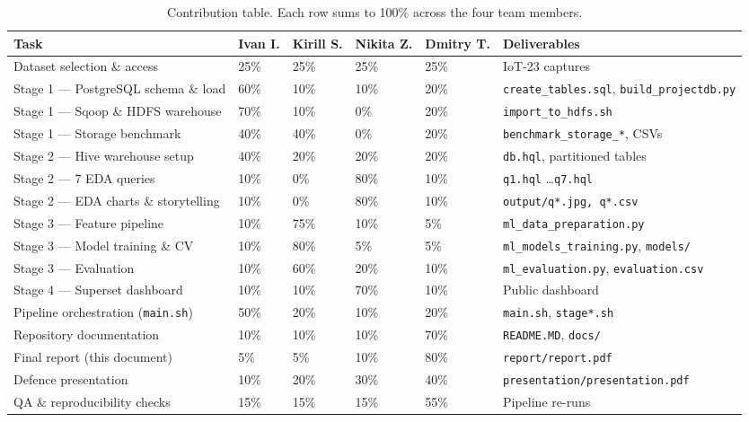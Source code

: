 \documentclass[11pt,a4paper]{article}
\begin{document}
\begin{table}[H]
\centering
\small
\renewcommand{\arraystretch}{1.2}
\begin{tabular}{p{4.5cm}p{1.6cm}p{1.6cm}p{1.6cm}p{1.6cm}p{2.6cm}}
\toprule
\textbf{Task} & \textbf{Ivan I.} & \textbf{Kirill S.} & \textbf{Nikita Z.} & \textbf{Dmitry T.} & \textbf{Deliverables} \\
\midrule
Dataset selection \& access            & 25\% & 25\% & 25\% & 25\% & IoT-23 captures \\
Stage 1 --- PostgreSQL schema \& load  & 60\% & 10\% & 10\% & 20\% & \texttt{create\_tables.sql}, \texttt{build\_projectdb.py} \\
Stage 1 --- Sqoop \& HDFS warehouse    & 70\% & 10\% &  0\% & 20\% & \texttt{import\_to\_hdfs.sh} \\
Stage 1 --- Storage benchmark          & 40\% & 40\% &  0\% & 20\% & \texttt{benchmark\_storage\_*}, CSVs \\
Stage 2 --- Hive warehouse setup       & 40\% & 20\% & 20\% & 20\% & \texttt{db.hql}, partitioned tables \\
Stage 2 --- 7 EDA queries              & 10\% &  0\% & 80\% & 10\% & \texttt{q1.hql} \dots \texttt{q7.hql} \\
Stage 2 --- EDA charts \& storytelling & 10\% &  0\% & 80\% & 10\% & \texttt{output/q*.jpg, q*.csv} \\
Stage 3 --- Feature pipeline           & 10\% & 75\% & 10\% &  5\% & \texttt{ml\_data\_preparation.py} \\
Stage 3 --- Model training \& CV       & 10\% & 80\% &  5\% &  5\% & \texttt{ml\_models\_training.py}, \texttt{models/} \\
Stage 3 --- Evaluation                 & 10\% & 60\% & 20\% & 10\% & \texttt{ml\_evaluation.py}, \texttt{evaluation.csv} \\
Stage 4 --- Superset dashboard         & 10\% & 10\% & 70\% & 10\% & Public dashboard \\
Pipeline orchestration (\texttt{main.sh}) & 50\% & 20\% & 10\% & 20\% & \texttt{main.sh}, \texttt{stage*.sh} \\
Repository documentation               & 10\% & 10\% & 10\% & 70\% & \texttt{README.MD}, \texttt{docs/} \\
Final report (this document)           &  5\% &  5\% & 10\% & 80\% & \texttt{report/report.pdf} \\
Defence presentation                   & 10\% & 20\% & 30\% & 40\% & \texttt{presentation/presentation.pdf} \\
QA \& reproducibility checks           & 15\% & 15\% & 15\% & 55\% & Pipeline re-runs \\
\bottomrule
\end{tabular}
\caption{Contribution table. Each row sums to 100\% across the four team
members.}
\end{table}
\end{document}
